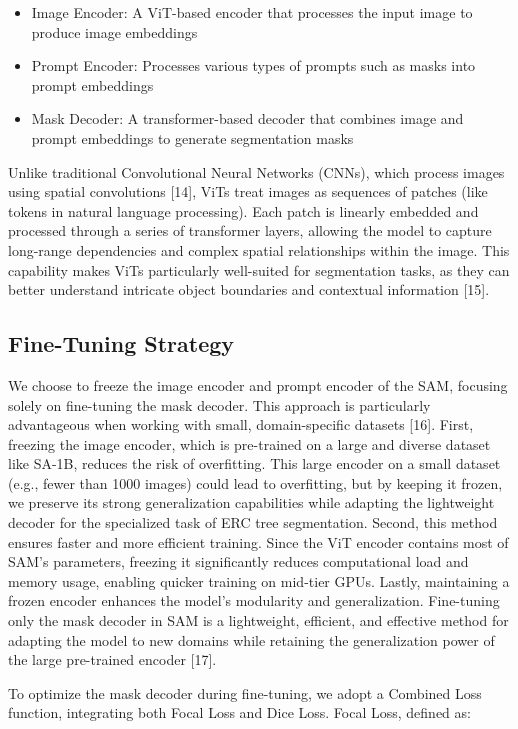 \documentclass[letterpaper, 10 pt, conference]{ieeeconf}  %
\begin{document}
\begin{itemize}
\item Image Encoder: A ViT-based encoder that processes the input image to produce image embeddings
\item Prompt Encoder: Processes various types of prompts such as masks into prompt embeddings
\item Mask Decoder: A transformer-based decoder that combines image and prompt embeddings to generate segmentation masks
\end{itemize}

Unlike traditional Convolutional Neural Networks (CNNs), which process images using spatial convolutions [14], ViTs treat images as sequences of patches (like tokens in natural language processing). Each patch is linearly embedded and processed through a series of transformer layers, allowing the model to capture long-range dependencies and complex spatial relationships within the image. This capability makes ViTs particularly well-suited for segmentation tasks, as they can better understand intricate object boundaries and contextual information [15].

\subsection{Fine-Tuning Strategy}
We choose to freeze the image encoder and prompt encoder of the SAM, focusing solely on fine-tuning the mask decoder. This approach is particularly advantageous when working with small, domain-specific datasets [16]. First, freezing the image encoder, which is pre-trained on a large and diverse dataset like SA-1B, reduces the risk of overfitting. This large encoder on a small dataset (e.g., fewer than 1000 images) could lead to overfitting, but by keeping it frozen, we preserve its strong generalization capabilities while adapting the lightweight decoder for the specialized task of ERC tree segmentation. Second, this method ensures faster and more efficient training. Since the ViT encoder contains most of SAM's parameters, freezing it significantly reduces computational load and memory usage, enabling quicker training on mid-tier GPUs. Lastly, maintaining a frozen encoder enhances the model’s modularity and generalization. Fine-tuning only the mask decoder in SAM is a lightweight, efficient, and effective method for adapting the model to new domains while retaining the generalization power of the large pre-trained encoder [17].

To optimize the mask decoder during fine-tuning, we adopt a Combined Loss function, integrating both Focal Loss and Dice Loss. Focal Loss, defined as:
\end{document}
